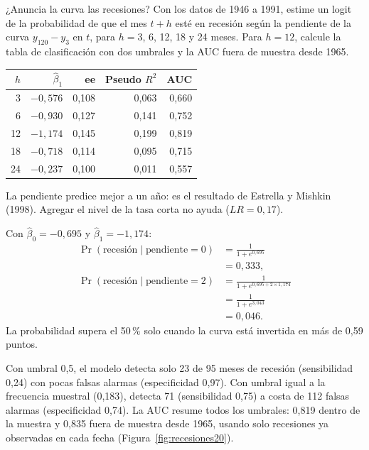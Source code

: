 \begin{ejresuelto}{¿Anuncia la curva las recesiones?}\label{ej:recesiones20}
\enunciado Con los datos de 1946 a 1991, estime un logit de la probabilidad de que el mes $t+h$ esté en recesión según la pendiente de la curva
$y_{120}-y_3$ en $t$, para $h=3$, 6, 12, 18 y 24 meses. Para $h=12$, calcule la tabla de clasificación con dos umbrales y la AUC fuera de
muestra desde 1965.

\solucion
{}
\begin{center}\small
\begin{tabular}{@{}rrrrr@{}}
\toprule
$h$ & $\hat\beta_1$ & ee & Pseudo $R^2$ & AUC \\
\midrule
3 & $-0{,}576$ & 0,108 & 0,063 & 0,660 \\
6 & $-0{,}930$ & 0,127 & 0,141 & 0,752 \\
12 & $-1{,}174$ & 0,145 & 0,199 & 0,819 \\
18 & $-0{,}718$ & 0,114 & 0,095 & 0,715 \\
24 & $-0{,}237$ & 0,100 & 0,011 & 0,557 \\
\bottomrule
\end{tabular}
\end{center}
La pendiente predice mejor a un año: es el resultado de Estrella y Mishkin (1998). Agregar el nivel de la tasa corta no ayuda ($LR=0{,}17$).

 Con $\hat\beta_0=-0{,}695$ y $\hat\beta_1=-1{,}174$:
\begin{align*}
  \Pr(\text{recesión}\mid\text{pendiente}=0) &= \frac{1}{1+e^{0{,}695}}\\
                                            &= 0{,}333,\\
  \Pr(\text{recesión}\mid\text{pendiente}=2) &= \frac{1}{1+e^{0{,}695+2\times1{,}174}}\\
                                            &= \frac{1}{1+e^{3{,}043}}\\
                                            &= 0{,}046 .
\end{align*}
La probabilidad supera el 50\,\% solo cuando la curva está invertida en más de 0,59 puntos.

 Con umbral 0,5, el modelo detecta solo 23 de 95 meses de recesión (sensibilidad 0,24) con pocas falsas alarmas
(especificidad 0,97). Con umbral igual a la frecuencia muestral (0,183), detecta 71 (sensibilidad 0,75) a costa de 112 falsas alarmas
(especificidad 0,74). La AUC resume todos los umbrales: 0,819 dentro de la muestra y 0,835 fuera de muestra desde 1965, usando solo
recesiones ya observadas en cada fecha (Figura~\ref{fig:recesiones20}).


\end{ejresuelto}
